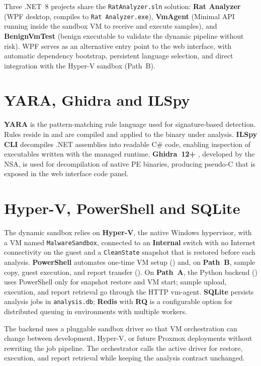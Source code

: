 Three .NET~8 projects share the \texttt{RatAnalyzer.sln} solution: \textbf{Rat Analyzer}
(WPF desktop, compiles to \texttt{Rat Analyzer.exe}), \textbf{VmAgent} (Minimal API running inside the sandbox
VM to receive and execute samples), and \textbf{BenignVmTest} (benign executable to validate
the dynamic pipeline without risk). WPF serves as an alternative entry point to the web
interface, with automatic dependency bootstrap, persistent language selection, and direct
integration with the Hyper-V sandbox (Path~B).

\section{YARA, Ghidra and ILSpy}

\textbf{YARA} \cite{yara2023} is the pattern-matching rule language used for signature-based
detection. Rules reside in  and are compiled and applied to the binary under
analysis. \textbf{ILSpy CLI} \cite{ilspy2024} decompiles .NET assemblies into readable C\#
code, enabling inspection of executables written with the managed runtime.
\textbf{Ghidra~12+} \cite{ghidra2019}, developed by the NSA, is used for decompilation of
native PE binaries, producing pseudo-C that is exposed in the web interface code panel.

\section{Hyper-V, PowerShell and SQLite}

The dynamic sandbox relies on \textbf{Hyper-V}, the native Windows hypervisor, with a VM named
\texttt{MalwareSandbox}, connected to an \textbf{Internal} switch with no Internet connectivity
on the guest and a \texttt{CleanState} snapshot that is restored before each analysis.
\textbf{PowerShell} automates one-time VM setup () and,
on \textbf{Path~B}, sample copy, guest execution, and report transfer
(). On \textbf{Path~A}, the Python backend
() uses PowerShell only for snapshot restore and VM start;
sample upload, execution, and report retrieval go through the HTTP vm-agent.
\textbf{SQLite} persists analysis jobs in \texttt{analysis.db}; \textbf{Redis}
with \textbf{RQ} is a configurable option for distributed queuing in environments with multiple workers.

The backend uses a pluggable sandbox driver so that VM orchestration can change between
development, Hyper-V, or future Proxmox deployments without rewriting the job pipeline. The
orchestrator calls the active driver for restore, execution, and report retrieval while keeping
the analysis contract unchanged.

